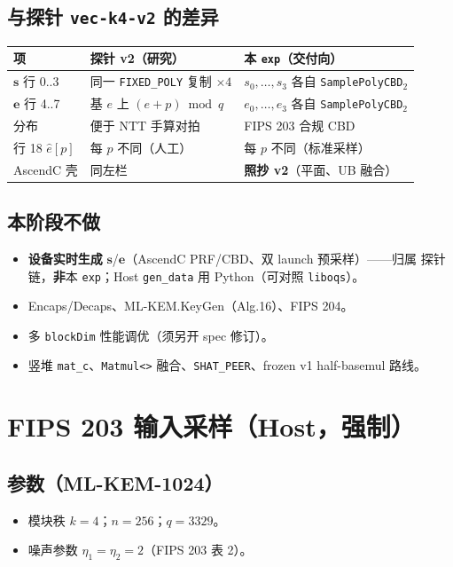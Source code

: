\documentclass[UTF8,a4paper,11pt]{ctexart}
\newcommand{\dirname}[1]{\texttt{\seqsplit{#1}}}
\begin{document}
\subsection{与探针 \texttt{vec-k4-v2} 的差异}
\begin{table}[h]
  \centering
  \begin{tabular}{@{}L{3.8cm}L{4.8cm}L{4.8cm}@{}}
    \toprule
    项 & 探针 v2（研究） & 本 \texttt{exp}（交付向） \\
    \midrule
    $\mathbf{s}$ 行 0..3 & 同一 \texttt{FIXED\_POLY} 复制 $\times 4$ & $s_0,\ldots,s_3$ 各自 \texttt{SamplePolyCBD}$_2$ \\
    $\mathbf{e}$ 行 4..7 & 基 $e$ 上 $(e{+}p)\bmod q$ & $e_0,\ldots,e_3$ 各自 \texttt{SamplePolyCBD}$_2$ \\
    分布 & 便于 NTT 手算对拍 & FIPS 203 合规 CBD \\
    行 18 $\hat{e}[p]$ & 每 $p$ 不同（人工） & 每 $p$ 不同（标准采样） \\
    AscendC 壳 & 同左栏 & \textbf{照抄 v2}（平面、UB 融合） \\
    \bottomrule
  \end{tabular}
\end{table}

\subsection{本阶段不做}
\begin{itemize}
  \item \textbf{设备实时生成} $\mathbf{s}$/$\mathbf{e}$（AscendC PRF/CBD、双 launch 预采样）——归属 \dirname{ascendc-tests/} 探针链，\textbf{非}本 \texttt{exp}；Host \texttt{gen\_data} 用 Python（可对照 \texttt{liboqs}）。
  \item Encaps/Decaps、ML-KEM.KeyGen（Alg.16）、FIPS 204。
  \item 多 \texttt{blockDim} 性能调优（须另开 spec 修订）。
  \item 竖堆 \texttt{mat\_c}、\texttt{Matmul<>} 融合、\texttt{SHAT\_PEER}、frozen v1 half-basemul 路线。
\end{itemize}

\section{FIPS 203 输入采样（Host，强制）}
\label{sec:sampling}

\subsection{参数（ML-KEM-1024）}
\begin{itemize}
  \item 模块秩 $k{=}4$；$n{=}256$；$q{=}3329$。
  \item 噪声参数 $\eta_1{=}\eta_2{=}2$（FIPS 203 表 2）。
\end{itemize}
\end{document}
